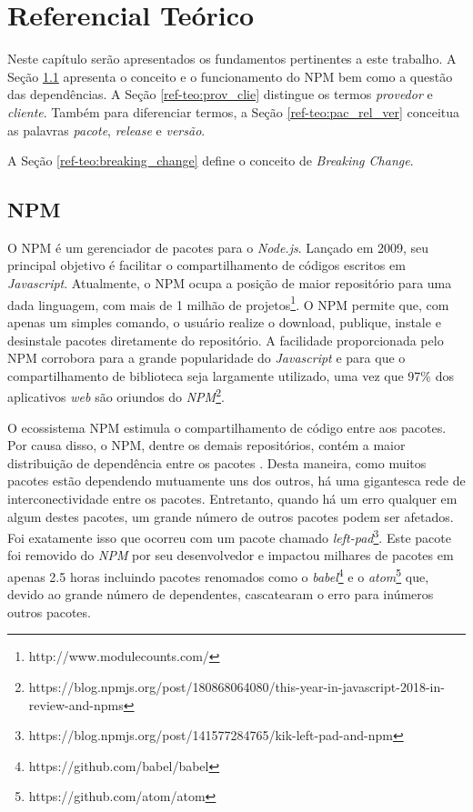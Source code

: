\chapter{Referencial Teórico}
\label{cap:ref-teorico}
Neste capítulo serão apresentados os fundamentos pertinentes a este trabalho. A Seção \ref{ref-teo:npm} apresenta o conceito e o funcionamento do \gls{NPM} bem como a questão das dependências. A Seção \ref{ref-teo:prov_clie} distingue os termos \textit{provedor} e \textit{cliente}. Também para diferenciar termos, a Seção \ref{ref-teo:pac_rel_ver} conceitua as palavras \textit{pacote}, \textit{release} e \textit{versão}.

A Seção \ref{ref-teo:breaking_change} define o conceito de \textit{Breaking Change}.

\section{\gls{NPM}}
\label{ref-teo:npm}
O \gls{NPM} é um gerenciador de pacotes para o \textit{Node.js}. Lançado em 2009, seu principal objetivo é facilitar o compartilhamento de códigos escritos em \textit{Javascript}. Atualmente, o \gls{NPM} ocupa a posição de maior repositório para uma dada linguagem, com mais de 1 milhão de projetos\footnote{http://www.modulecounts.com/}. O \gls{NPM} permite que, com apenas um simples comando, o usuário realize o download, publique, instale e desinstale pacotes diretamente do repositório. A facilidade proporcionada pelo \gls{NPM} corrobora para a grande popularidade do \textit{Javascript} e para que o compartilhamento de biblioteca seja largamente utilizado, uma vez que 97\% dos aplicativos \textit{web} são oriundos do \textit{NPM}\footnote{https://blog.npmjs.org/post/180868064080/this-year-in-javascript-2018-in-review-and-npms}.

O ecossistema \gls{NPM} estimula o compartilhamento de código entre aos pacotes. Por causa disso, o \gls{NPM}, dentre os demais repositórios, contém a maior distribuição de dependência entre os pacotes \cite{teorical_reference:npm_2}. Desta maneira, como muitos pacotes estão dependendo mutuamente uns dos outros, há uma gigantesca rede de interconectividade entre os pacotes. Entretanto, quando há um erro qualquer em algum destes pacotes, um grande número de outros pacotes podem ser afetados. Foi exatamente isso que ocorreu com um pacote chamado \textit{left-pad}\footnote{https://blog.npmjs.org/post/141577284765/kik-left-pad-and-npm}. Este pacote foi removido do \textit{NPM} por seu desenvolvedor e impactou milhares de pacotes em apenas 2.5 horas incluindo pacotes renomados como o \textit{babel}\footnote{https://github.com/babel/babel} e o \textit{atom}\footnote{https://github.com/atom/atom} que, devido ao grande número de dependentes, cascatearam o erro para inúmeros outros pacotes.

